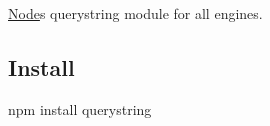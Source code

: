 \href{http://travis-ci.org/Gozala/querystring}{\tt }

\href{http://ci.testling.com/Gozala/querystring}{\tt }

\mbox{\hyperlink{classNode}{Node}}\textquotesingle{}s querystring module for all engines.

\subsection*{Install}

\begin{DoxyVerb}npm install querystring\end{DoxyVerb}
 